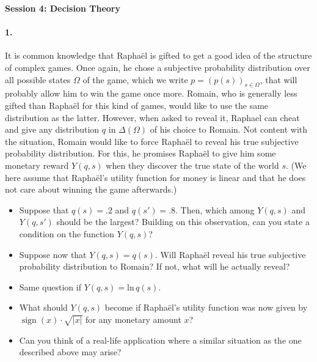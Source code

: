 \documentclass[a4paper,notitlepage,12pt]{article}
\begin{document}
\setlength{\parindent}{0pt}
\setlength{\parskip}{1ex plus 0.5ex minus 0.2ex}

\large

\textbf{Session 4: Decision Theory}


\paragraph{1. } It is common knowledge that Rapha\"el is gifted to get a good idea of the structure of complex games. Once again, he chose a subjective probability distribution over all possible states $\Omega$ of the game, which we write $p = (p(s))_{s \in \Omega}$, that will probably allow him to win the game once more. Romain, who is generally less gifted than Rapha\"el for this kind of games, would like to use the same distribution as the latter. However, when asked to reveal it, Raphael can cheat and give any distribution $q$ in $\Delta(\Omega)$ of his choice to Romain. Not content with the situation, Romain would like to force Rapha\"el to reveal his true subjective probability distribution. For this, he promises Rapha\"el to give him some monetary reward $Y(q, s)$ when they discover the true state of the world $s$. (We here assume that Rapha\"el's utility function for money is linear and that he does not care about winning the game afterwards.)
\begin{itemize}
	\item Suppose that $q(s) = .2$ and $q(s') = .8$. Then, which among $Y(q,s)$ and $Y(q,s')$ should be the largest? Building on this observation, can you state a condition on the function $Y(q,s)$?
	\item Suppose now that $Y(q,s) = q(s)$. Will Rapha\"el reveal his true subjective probability distribution to Romain? If not, what will he actually reveal?
	\item Same question if $Y(q, s) = \mathrm{ln}\,q(s)$.
	\item What should $Y(q, s)$ become if Rapha\"el's utility function was now given by $\mathop{\mathrm{sign}}(x)\cdot \sqrt{|x|}$ for any monetary amount $x$?
	\item Can you think of a real-life application where a similar situation as the one described above may arise?
\end{itemize}
\end{document}
